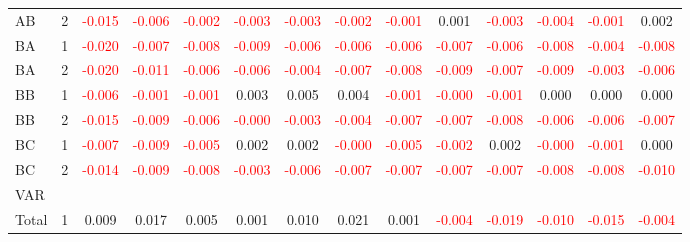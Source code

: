 \begin{table}[!htb]
{\begin{tabular}{llcccccccccccc}
AB & 2 & \textcolor{red}{-0.015} & \textcolor{red}{-0.006} & \textcolor{red}{-0.002} & \textcolor{red}{-0.003} & \textcolor{red}{-0.003} & \textcolor{red}{-0.002} & \textcolor{red}{-0.001} & 0.001 & \textcolor{red}{-0.003} & \textcolor{red}{-0.004} & \textcolor{red}{-0.001} & 0.002\\
BA & 1 & \textcolor{red}{-0.020} & \textcolor{red}{-0.007} & \textcolor{red}{-0.008} & \textcolor{red}{-0.009} & \textcolor{red}{-0.006} & \textcolor{red}{-0.006} & \textcolor{red}{-0.006} & \textcolor{red}{-0.007} & \textcolor{red}{-0.006} & \textcolor{red}{-0.008} & \textcolor{red}{-0.004} & \textcolor{red}{-0.008}\\
BA & 2 & \textcolor{red}{-0.020} & \textcolor{red}{-0.011} & \textcolor{red}{-0.006} & \textcolor{red}{-0.006} & \textcolor{red}{-0.004} & \textcolor{red}{-0.007} & \textcolor{red}{-0.008} & \textcolor{red}{-0.009} & \textcolor{red}{-0.007} & \textcolor{red}{-0.009} & \textcolor{red}{-0.003} & \textcolor{red}{-0.006}\\
BB & 1 & \textcolor{red}{-0.006} & \textcolor{red}{-0.001} & \textcolor{red}{-0.001} & 0.003 & 0.005 & 0.004 & \textcolor{red}{-0.001} & \textcolor{red}{-0.000} & \textcolor{red}{-0.001} & 0.000 & 0.000 & 0.000\\
BB & 2 & \textcolor{red}{-0.015} & \textcolor{red}{-0.009} & \textcolor{red}{-0.006} & \textcolor{red}{-0.000} & \textcolor{red}{-0.003} & \textcolor{red}{-0.004} & \textcolor{red}{-0.007} & \textcolor{red}{-0.007} & \textcolor{red}{-0.008} & \textcolor{red}{-0.006} & \textcolor{red}{-0.006} & \textcolor{red}{-0.007}\\
BC & 1 & \textcolor{red}{-0.007} & \textcolor{red}{-0.009} & \textcolor{red}{-0.005} & 0.002 & 0.002 & \textcolor{red}{-0.000} & \textcolor{red}{-0.005} & \textcolor{red}{-0.002} & 0.002 & \textcolor{red}{-0.000} & \textcolor{red}{-0.001} & 0.000\\
BC & 2 & \textcolor{red}{-0.014} & \textcolor{red}{-0.009} & \textcolor{red}{-0.008} & \textcolor{red}{-0.003} & \textcolor{red}{-0.006} & \textcolor{red}{-0.007} & \textcolor{red}{-0.007} & \textcolor{red}{-0.007} & \textcolor{red}{-0.007} & \textcolor{red}{-0.008} & \textcolor{red}{-0.008} & \textcolor{red}{-0.010}\\
\hline
VAR &  &  &  &  &  &  &  &  &  &  &  &  & \\
\hline
Total & 1 & 0.009 & 0.017 & 0.005 & 0.001 & 0.010 & 0.021 & 0.001 & \textcolor{red}{-0.004} & \textcolor{red}{-0.019} & \textcolor{red}{-0.010} & \textcolor{red}{-0.015} & \textcolor{red}{-0.004}\\

\end{tabular}}
\end{table}
